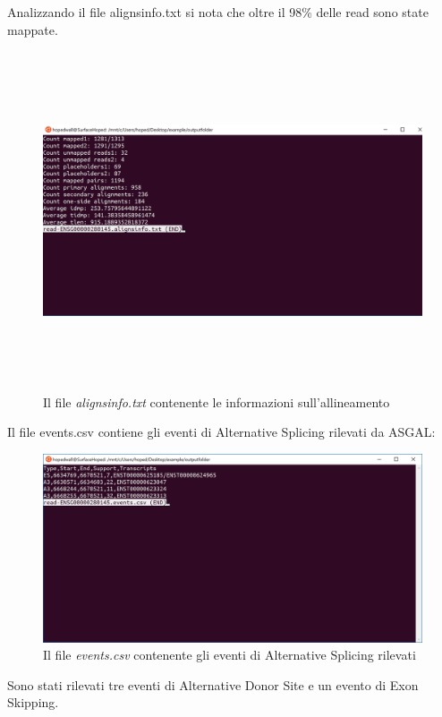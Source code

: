 Analizzando il file alignsinfo.txt si nota che oltre il 98\% delle read sono state mappate.

\begin{figure}[h!]
	\centering
	\includegraphics[width=\linewidth,height=10cm]{images/alignsinfotxt.png}
	\caption{Il file \textit{alignsinfo.txt} contenente le informazioni sull'allineamento}
  \label{fig:AlignsInfoExperiment}
\end{figure}

\newpage

Il file events.csv contiene gli eventi di Alternative Splicing rilevati da ASGAL:


\begin{figure}[h!]
	\centering
	\includegraphics[width=\linewidth]{images/results.png}
	\caption{Il file \textit{events.csv} contenente gli eventi di Alternative Splicing rilevati}
  \label{fig:Results}
\end{figure}

Sono stati rilevati tre eventi di Alternative Donor Site e un evento di Exon Skipping.

\newpage